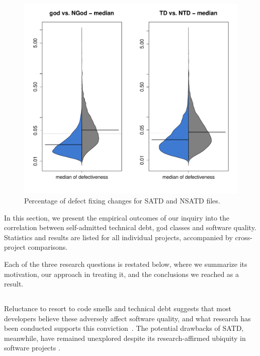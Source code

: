\begin{figure}[tb]
	\centering
	\includegraphics[width=140mm]{figures/chapter4/rq1_defectivness_distrubution}
	\caption{Percentage of defect fixing changes for SATD and NSATD files.}
	\label{figure:ch4_number_of_fixing_changes_TD_vs_NTD}
\end{figure}

In this section, we present the empirical outcomes of our inquiry into the correlation between self-admitted technical debt, god classes and software quality. Statistics and results are listed for all individual projects, accompanied by cross-project comparisons.

Each of the three research questions is restated below, where we summarize its motivation, our approach in treating it, and the conclusions we reached as a result.

\subsection*{\chapterIVrqI}


Reluctance to resort to code smells and technical debt suggests that most developers believe these adversely affect software quality, and what research has been conducted supports this conviction~\cite{zazworka2011investigating}.  The potential drawbacks of SATD, meanwhile, have remained unexplored despite its research-affirmed ubiquity in software projects \cite{ICSM_PotdarS14}.

